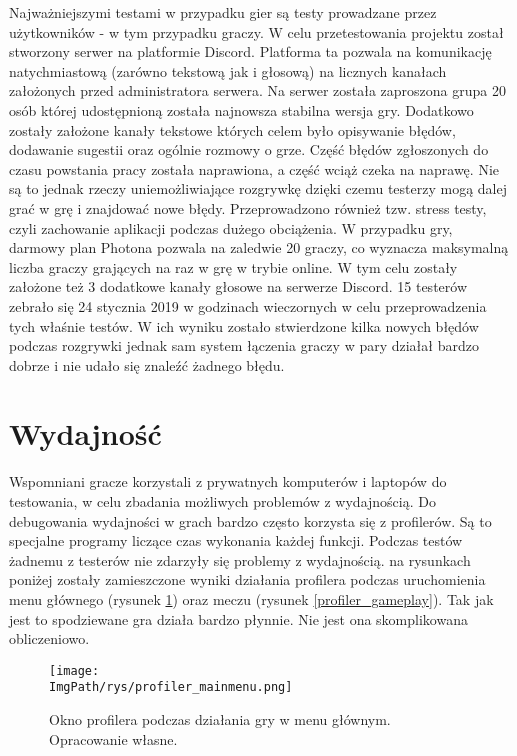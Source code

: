 \documentclass[a4paper,12pt,twoside,openany]{report}
\newcommand{\ImgPath}{.}
\begin{document}
Najważniejszymi testami w przypadku gier są testy prowadzane przez użytkowników - w tym przypadku graczy. W celu przetestowania projektu został stworzony serwer na platformie Discord. Platforma ta pozwala na komunikację natychmiastową (zarówno tekstową jak i głosową) na licznych kanałach założonych przed administratora serwera. Na serwer została zaproszona grupa 20 osób której udostępnioną została najnowsza stabilna wersja gry. Dodatkowo zostały założone kanały tekstowe których celem było opisywanie błędów, dodawanie sugestii oraz ogólnie rozmowy o grze. Część błędów zgłoszonych do czasu powstania pracy została naprawiona, a część wciąż czeka na naprawę. Nie są to jednak rzeczy uniemożliwiające rozgrywkę dzięki czemu testerzy mogą dalej grać w grę i znajdować nowe błędy. Przeprowadzono również tzw. stress testy, czyli zachowanie aplikacji podczas dużego obciążenia. W przypadku gry, darmowy plan Photona pozwala na zaledwie 20 graczy, co wyznacza maksymalną liczba graczy grających na raz w grę w trybie online. W tym celu zostały założone też 3 dodatkowe kanały głosowe na serwerze Discord. 15 testerów zebrało się 24 stycznia 2019 w godzinach wieczornych w celu przeprowadzenia tych właśnie testów. W ich wyniku zostało stwierdzone kilka nowych błędów podczas rozgrywki jednak sam system łączenia graczy w pary działał bardzo dobrze i nie udało się znaleźć żadnego błędu.

\section{Wydajność}
Wspomniani gracze korzystali z prywatnych komputerów i laptopów do testowania, w celu zbadania możliwych problemów z wydajnością. Do debugowania wydajności w grach bardzo często korzysta się z profilerów. Są to specjalne programy liczące czas wykonania każdej funkcji. Podczas testów żadnemu z testerów nie zdarzyły się problemy z wydajnością. na rysunkach poniżej zostały zamieszczone wyniki działania profilera podczas uruchomienia menu głównego (rysunek \ref{profiler_mainmenu}) oraz meczu (rysunek \ref{profiler_gameplay}). Tak jak jest to spodziewane gra działa bardzo płynnie. Nie jest ona skomplikowana obliczeniowo.

\begin{figure}[H]
	\begin{center}
\centering
\texttt{[image: \\ImgPath/rys/profiler\_mainmenu.png]}
\end{center}
	\caption{Okno profilera podczas działania gry w menu głównym. Opracowanie własne.}
	\label{profiler_mainmenu}
\end{figure}
\end{document}
